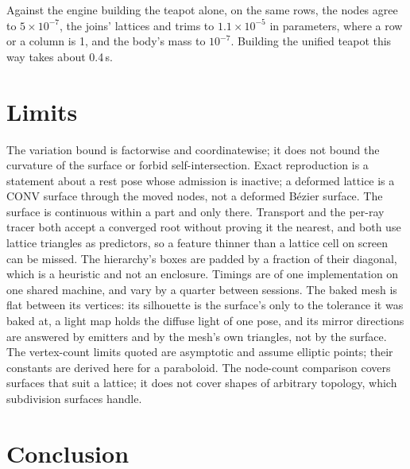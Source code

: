 \documentclass[journal]{IEEEtran}
\begin{document}
Against the engine building the teapot alone, on the same rows, the
nodes agree to $5\times10^{-7}$, the joins' lattices and trims to
$1.1\times10^{-5}$ in parameters, where a row or a column is 1, and the
body's mass to $10^{-7}$. Building the unified teapot this way takes
about 0.4\,s.

\section{Limits}

The variation bound is factorwise and coordinatewise; it does not bound
the curvature of the surface or forbid self-intersection. Exact
reproduction is a statement about a rest pose whose admission is
inactive; a deformed lattice is a CONV surface through the moved nodes,
not a deformed B\'ezier surface. The surface is continuous within a part
and only there. Transport and the per-ray tracer both accept a converged
root without proving it the nearest, and both use lattice triangles as
predictors, so a feature thinner than a lattice cell on screen can be
missed. The hierarchy's boxes are padded by a fraction of their diagonal,
which is a heuristic and not an enclosure. Timings are of one
implementation on one shared machine, and vary by a quarter between
sessions. The baked mesh is flat between its vertices: its silhouette is
the surface's only to the tolerance it was baked at, a light map holds
the diffuse light of one pose, and its mirror directions are answered by emitters and by the mesh's
own triangles, not by the surface. The vertex-count limits quoted are asymptotic and assume
elliptic points; their constants are derived here for a paraboloid. The
node-count comparison covers surfaces that suit a
lattice; it does not cover shapes of arbitrary topology, which
subdivision surfaces handle.

\section{Conclusion}
\end{document}
